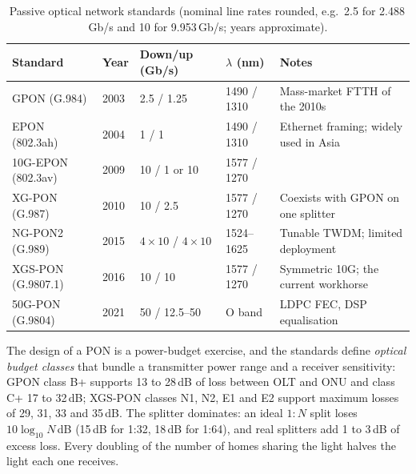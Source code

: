 
\begin{table}[htbp]\centering\small
\caption{Passive optical network standards (nominal line rates rounded, e.g.\ 2.5 for 2.488\,Gb/s and 10 for 9.953\,Gb/s; years approximate).}
\label{tab:ch24:pon}
\begin{tabularx}{\linewidth}{@{}l l l l X@{}}
\toprule
Standard & Year & Down/up (Gb/s) & $\lambda$ (nm) & Notes\\
\midrule
GPON (G.984) & 2003 & 2.5 / 1.25 & 1490 / 1310 & Mass-market FTTH of the 2010s\\
EPON (802.3ah) & 2004 & 1 / 1 & 1490 / 1310 & Ethernet framing; widely used in Asia\\
10G-EPON (802.3av) & 2009 & 10 / 1 or 10 & 1577 / 1270 & \\
XG-PON (G.987) & 2010 & 10 / 2.5 & 1577 / 1270 & Coexists with GPON on one splitter\\
NG-PON2 (G.989) & 2015 & $4\times10$ / $4\times10$ & 1524--1625 & Tunable TWDM; limited deployment\\
XGS-PON (G.9807.1) & 2016 & 10 / 10 & 1577 / 1270 & Symmetric 10G; the current workhorse\\
50G-PON (G.9804) & 2021 & 50 / 12.5--50 & O band & LDPC FEC, DSP equalisation\\
\bottomrule
\end{tabularx}
\end{table}

The design of a PON is a power-budget exercise, and the standards define \emph{optical budget classes}
that bundle a transmitter power range and a receiver sensitivity: GPON class B+ supports 13 to 28\,dB of
loss between OLT and ONU and class C+ 17 to 32\,dB; XGS-PON classes N1, N2, E1 and E2 support maximum
losses of 29, 31, 33 and 35\,dB. The splitter dominates: an ideal $1{:}N$ split loses $10\log_{10}N$\,dB
(15\,dB for 1:32, 18\,dB for 1:64), and real splitters add 1 to 3\,dB of excess loss. Every doubling of
the number of homes sharing the light halves the light each one receives.

